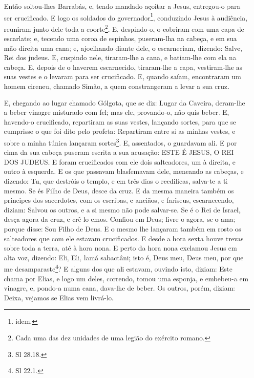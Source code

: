 Então soltou-lhes Barrabás, e, tendo mandado açoitar a Jesus,
entregou-o para ser crucificado. E logo os soldados do
governador\footnote{idem.}, conduzindo Jesus à audiência, reuniram
junto dele toda a coorte\footnote{Cada uma das dez unidades de uma
legião do exército romano.}. E, despindo-o, o cobriram com
uma capa de escarlate; e, tecendo uma coroa de espinhos,
puseram-lha na cabeça, e em sua mão direita uma cana; e, ajoelhando
diante dele, o escarneciam, dizendo: Salve, Rei dos judeus.
E, cuspindo nele, tiraram-lhe a cana, e batiam-lhe com ela na
cabeça. E, depois de o haverem escarnecido, tiraram-lhe a
capa, vestiram-lhe as suas vestes e o levaram para ser crucificado.
E, quando saíam, encontraram um homem cireneu, chamado Simão,
a quem constrangeram a levar a sua cruz.

E, chegando ao lugar chamado Gólgota, que se diz: Lugar da
Caveira, deram-lhe a beber vinagre misturado com fel; mas
ele, provando-o, não quis beber. E, havendo-o crucificado,
repartiram as suas vestes, lançando sortes, para que se cumprisse o
que foi dito pelo profeta: Repartiram entre si as minhas vestes, e
sobre a minha túnica lançaram sortes\footnote{Sl 28.18.}. E,
assentados, o guardavam ali. E por cima da sua cabeça puseram
escrita a sua acusação: ESTE É JESUS, O REI DOS JUDEUS. E
foram crucificados com ele dois salteadores, um à direita, e outro à
esquerda. E os que passavam blasfemavam dele, meneando as
cabeças, e dizendo: Tu, que destróis o templo, e em três dias
o reedificas, salva-te a ti mesmo. Se és Filho de Deus, desce da
cruz. E da mesma maneira também os príncipes dos sacerdotes,
com os escribas, e anciãos, e fariseus, escarnecendo, diziam:
Salvou os outros, e a si mesmo não pode salvar-se. Se é o Rei
de Israel, desça agora da cruz, e crê-lo-emos. Confiou em
Deus; livre-o agora, se o ama; porque disse: Sou Filho de Deus.
E o mesmo lhe lançaram também em rosto os salteadores que com
ele estavam crucificados. E desde a hora sexta houve trevas
sobre toda a terra, até à hora nona. E perto da hora nona
exclamou Jesus em alta voz, dizendo: Eli, Eli, lamá sabactâni; isto
é, Deus meu, Deus meu, por que me desamparaste\footnote{Sl 22.1.}?
E alguns dos que ali estavam, ouvindo isto, diziam: Este
chama por Elias, e logo um deles, correndo, tomou uma
esponja, e embebeu-a em vinagre, e, pondo-a numa cana, dava-lhe de
beber. Os outros, porém, diziam: Deixa, vejamos se Elias vem
livrá-lo.

